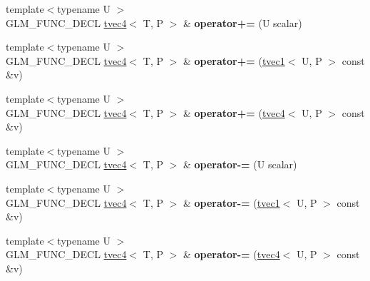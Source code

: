 \begin{DoxyCompactItemize}
\item 
\hypertarget{structglm_1_1tvec4_a68b20faded17ea18abdd3f3210df9d72}{{\footnotesize template$<$typename U $>$ }\\G\-L\-M\-\_\-\-F\-U\-N\-C\-\_\-\-D\-E\-C\-L \hyperlink{structglm_1_1tvec4}{tvec4}$<$ T, P $>$ \& {\bfseries operator+=} (U scalar)}\label{structglm_1_1tvec4_a68b20faded17ea18abdd3f3210df9d72}

\item 
\hypertarget{structglm_1_1tvec4_a0bb5ea385459a6ce515301cc4ee02368}{{\footnotesize template$<$typename U $>$ }\\G\-L\-M\-\_\-\-F\-U\-N\-C\-\_\-\-D\-E\-C\-L \hyperlink{structglm_1_1tvec4}{tvec4}$<$ T, P $>$ \& {\bfseries operator+=} (\hyperlink{structglm_1_1tvec1}{tvec1}$<$ U, P $>$ const \&v)}\label{structglm_1_1tvec4_a0bb5ea385459a6ce515301cc4ee02368}

\item 
\hypertarget{structglm_1_1tvec4_a640fd04b14ab0540880eb905da18351a}{{\footnotesize template$<$typename U $>$ }\\G\-L\-M\-\_\-\-F\-U\-N\-C\-\_\-\-D\-E\-C\-L \hyperlink{structglm_1_1tvec4}{tvec4}$<$ T, P $>$ \& {\bfseries operator+=} (\hyperlink{structglm_1_1tvec4}{tvec4}$<$ U, P $>$ const \&v)}\label{structglm_1_1tvec4_a640fd04b14ab0540880eb905da18351a}

\item 
\hypertarget{structglm_1_1tvec4_af782f3e86c5590d64f950a389329a39a}{{\footnotesize template$<$typename U $>$ }\\G\-L\-M\-\_\-\-F\-U\-N\-C\-\_\-\-D\-E\-C\-L \hyperlink{structglm_1_1tvec4}{tvec4}$<$ T, P $>$ \& {\bfseries operator-\/=} (U scalar)}\label{structglm_1_1tvec4_af782f3e86c5590d64f950a389329a39a}

\item 
\hypertarget{structglm_1_1tvec4_ac24de9d6acf744c2096912edc4df028b}{{\footnotesize template$<$typename U $>$ }\\G\-L\-M\-\_\-\-F\-U\-N\-C\-\_\-\-D\-E\-C\-L \hyperlink{structglm_1_1tvec4}{tvec4}$<$ T, P $>$ \& {\bfseries operator-\/=} (\hyperlink{structglm_1_1tvec1}{tvec1}$<$ U, P $>$ const \&v)}\label{structglm_1_1tvec4_ac24de9d6acf744c2096912edc4df028b}

\item 
\hypertarget{structglm_1_1tvec4_afe14eb392701467a495123d8163827eb}{{\footnotesize template$<$typename U $>$ }\\G\-L\-M\-\_\-\-F\-U\-N\-C\-\_\-\-D\-E\-C\-L \hyperlink{structglm_1_1tvec4}{tvec4}$<$ T, P $>$ \& {\bfseries operator-\/=} (\hyperlink{structglm_1_1tvec4}{tvec4}$<$ U, P $>$ const \&v)}\label{structglm_1_1tvec4_afe14eb392701467a495123d8163827eb}


\end{DoxyCompactItemize}
